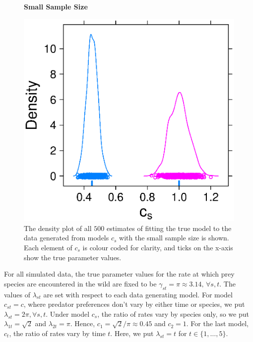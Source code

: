 \documentclass[smallextended]{svjour3}
\begin{document}
\begin{figure}
  \textbf{Small Sample Size}\par
  \centering
  \includegraphics[scale=0.75]{small}
  \caption{The density plot of all $500$ estimates of fitting the true model to the data generated from models $c_s$ with the small sample size is shown.  Each element of $c_s$ is colour coded for clarity, and ticks on the x-axis show the true parameter values.}
  \label{fig:small}
\end{figure}

For all simulated data, the true parameter values for the rate at which prey species are encountered in the wild are fixed to be $\gamma_{st} = \pi \approx 3.14, \, \forall s,t$.  The values of $\lambda_{st}$ are set with respect to each data generating model.  For model $c_{st} = c$, where predator preferences don't vary by either time or species, we put $\lambda_{st} = 2\pi, \forall s,t$.  Under model $c_s$, the ratio of rates vary by species only, so we put $\lambda_{1t} = \sqrt{2}$ and $\lambda_{2t} = \pi$.  Hence, $c_1 = \sqrt{2}/\pi \approx 0.45$ and $c_2 = 1$.  For the last model, $c_t$, the ratio of rates vary by time $t$.  Here, we put $\lambda_{st} = t$ for $t \in \{1, \ldots, 5 \}$.  
\end{document}
